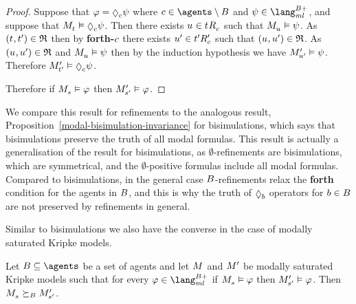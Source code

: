 \begin{proof}
Suppose that $\phi = \possibleC \psi$ where $\agentC \in \agents \setminus \agentsB$ and $\psi \in \langMlPlusBs$, and suppose that $\kPModel{\kStateT} \entails \possibleC \psi$.
Then there exists $\kStateU \in \kSuccessorsC{\kStateT}$ such that $\kPModel{\kStateU} \entails \psi$.
As $(\kStateT, \kStateTP) \in \refinement$ then by {\bf forth-$c$} there exists ${u}^{\prime} \in {{t}^{\prime}} {R^{\prime}_{c}}$ such that $(\kStateU, \kStateUP) \in \refinement$.
As $(\kStateU, \kStateUP) \in \refinement$ and $\kPModel{\kStateU} \entails \psi$ then by the induction hypothesis we have ${M^{\prime}_{{u}^{\prime}}} \vDash \psi$.
Therefore $\kPModelP{\kStateTP} \entails \possibleC \psi$.

Therefore if $\kPModel{\kStateS} \entails \phi$ then ${M^{\prime}_{{s}^{\prime}}} \vDash \varphi$.
\end{proof}

We compare this result for refinements to the analogous result, Proposition~\ref{modal-bisimulation-invariance} for bisimulations, which says that bisimulations preserve the truth of all modal formulas.
This result is actually a generalisation of the result for bisimulations, as $\emptyset$-refinements are bisimulations, which are symmetrical, and the $\emptyset$-positive formulas include all modal formulas.
Compared to bisimulations, in the general case $B$-refinements relax the {\bf forth} condition for the agents in $B$, and this is why the truth of $\possibleB$ operators for $b \in B$ are not preserved by refinements in general.

Similar to bisimulations we also have the converse in the case of modally saturated Kripke models.

\begin{proposition}\label{refinements-hennessy-milner}
Let $\agentsB \subseteq \agents$ be a set of agents and let $\kModel$ and ${M^{\prime}_{}}$ be modally saturated Kripke models such that for every $\phi \in \langMlPlusBs$ if $\kPModel{\kStateS} \entails \phi$ then ${M^{\prime}_{{s}^{\prime}}} \vDash \varphi$.
Then $\kPModel{\kStateS} \simulatesBs \kPModelP{\kStateSP}$.
\end{proposition}

